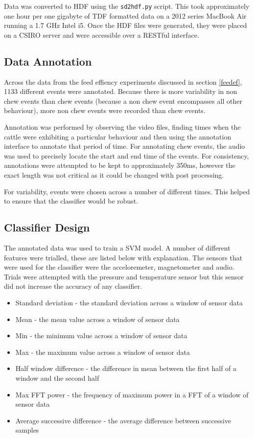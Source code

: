 Data was converted to HDF using the \texttt{sd2hdf.py} script. This took approximately one hour per one gigabyte of TDF formatted data on a 2012 series MacBook Air running a 1.7 GHz Intel i5. Once the HDF files were generated, they were placed on a CSIRO server and were accessible over a RESTful interface. 

\subsection{Data Annotation}

Across the data from the feed effiency experiments discussed in section \ref{feedef}, 1133 different events were annotated. Because there is more variability in non chew events than chew events (because a non chew event encompasses all other behaviour), more non chew events were recorded than chew events. 

Annotation was performed by observing the video files, finding times when the cattle were exhibiting a particular behaviour and then using the annotation interface to annotate that period of time. For annotating chew events, the audio was used to precisely locate the start and end time of the events. For consistency, annotations were attempted to be kept to approximately 350ms, however the exact length was not critical as it could be changed with post processing. 

For variability, events were chosen across a number of different times. This helped to ensure that the classifier would be robust. 

\subsection{Classifier Design}

The annotated data was used to train a SVM model. A number of different features were trialled, these are listed below with explanation. The sensors that were used for the classifier were the acceloremeter, magnetometer and audio. Trials were attempted with the pressure and temperature sensor but this sensor did not increase the accuracy of any classifier. 

\begin{itemize}
\item Standard deviation - the standard deviation across a window of sensor data
\item Mean - the mean value across a window of sensor data
\item Min - the minimum value across a window of sensor data
\item Max - the maximum value across a window of sensor data
\item Half window difference - the difference in mean between the first half of a window and the second half
\item Max FFT power - the frequency of maximum power in a FFT of a window of sensor data
\item Average successive difference - the average difference between successive samples
\end{itemize}

